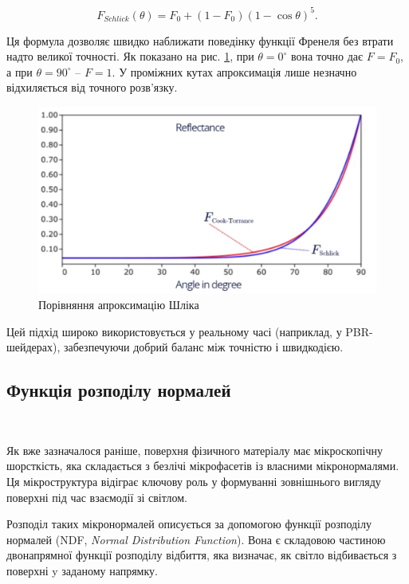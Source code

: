 \begin{equation}
    F_{Schlick}(\theta) = F_0 + (1 - F_0)(1 - \cos \theta)^5.
\end{equation}

Ця формула дозволяє швидко наближати поведінку функції Френеля без втрати надто великої точності.
 Як показано на рис. \ref{fig:Schlick}, при $\theta = 0^\circ$ вона точно дає $F = F_0$, а при $\theta = 90^\circ$ -- $F = 1$. 
 У проміжних кутах апроксимація лише незначно відхиляється від точного розв’язку.
 \begin{figure}[h]
  \centering
  \includegraphics[scale=0.55]{Pictures/Shlick.png}
  \caption{Порівняння апроксимацію Шліка}
  \label{fig:Schlick}
\end{figure}

Цей підхід широко використовується у реальному часі (наприклад, у PBR-шейдерах), забезпечуючи добрий баланс між точністю і швидкодією.

\subsection{Функція розподілу нормалей}\\

\par
Як вже зазначалося раніше, поверхня фізичного матеріалу має мікроскопічну шорсткість, яка складається з безлічі мікрофасетів із власними мікронормалями. 
Ця мікроструктура відіграє ключову роль у формуванні зовнішнього вигляду поверхні під час взаємодії зі світлом.

Розподіл таких мікронормалей описується за допомогою функції розподілу нормалей (NDF, \textit{Normal Distribution Function}). Вона є складовою частиною 
двонапрямної функції розподілу відбиття, яка визначає, як світло від\-би\-ва\-єть\-ся з поверхні y 
заданому напрямку.

